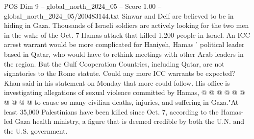 \begin{textsample}{POS Dim 9 – global\_north\_2024\_05 – Score 1.00 – global\_north\_2024\_05/200483144.txt}
Sinwar and Deif are believed to be in hiding in Gaza.
Thousands of Israeli soldiers are actively looking for the two men in the wake of the Oct. 7 Hamas attack that killed 1,200 people in Israel.
An ICC arrest warrant would be more complicated for Haniyeh, Hamas ' political leader based in Qatar, who would have to rethink meetings with other Arab leaders in the region.
But the Gulf Cooperation Countries, including Qatar, are not signatories to the Rome statute.
Could any more ICC warrants be expected?
Khan said in his statement on Monday that more could follow.
His office is investigating allegations of sexual violence committed by Hamas, @ @ @ @ @ @ @ @ @ @ to cause so many civilian deaths, injuries, and suffering in Gaza."At least 35,000 Palestinians have been killed since Oct. 7, according to the Hamas-led Gaza health ministry, a figure that is deemed credible by both the U.N. and the U.S. government.

\end{textsample}
